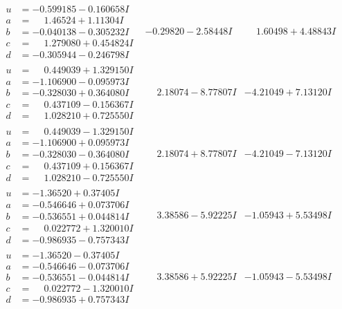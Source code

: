 \documentclass[1p]{elsarticle_modified}
\theoremstyle{definition}
\begin{document}
$$\begin{array}{c|c|c}
\begin{aligned}
u &= -0.599185 - 0.160658 I \\
a &= \phantom{-}1.46524 + 1.11304 I \\
b &= -0.040138 - 0.305232 I \\
c &= \phantom{-}1.279080 + 0.454824 I \\
d &= -0.305944 - 0.246798 I\end{aligned}
 & -0.29820 - 2.58448 I & \phantom{-}1.60498 + 4.48843 I \\ \hline\begin{aligned}
u &= \phantom{-}0.449039 + 1.329150 I \\
a &= -1.106900 - 0.095973 I \\
b &= -0.328030 + 0.364080 I \\
c &= \phantom{-}0.437109 - 0.156367 I \\
d &= \phantom{-}1.028210 + 0.725550 I\end{aligned}
 & \phantom{-}2.18074 - 8.77807 I & -4.21049 + 7.13120 I \\ \hline\begin{aligned}
u &= \phantom{-}0.449039 - 1.329150 I \\
a &= -1.106900 + 0.095973 I \\
b &= -0.328030 - 0.364080 I \\
c &= \phantom{-}0.437109 + 0.156367 I \\
d &= \phantom{-}1.028210 - 0.725550 I\end{aligned}
 & \phantom{-}2.18074 + 8.77807 I & -4.21049 - 7.13120 I \\ \hline\begin{aligned}
u &= -1.36520 + 0.37405 I \\
a &= -0.546646 + 0.073706 I \\
b &= -0.536551 + 0.044814 I \\
c &= \phantom{-}0.022772 + 1.320010 I \\
d &= -0.986935 - 0.757343 I\end{aligned}
 & \phantom{-}3.38586 - 5.92225 I & -1.05943 + 5.53498 I \\ \hline\begin{aligned}
u &= -1.36520 - 0.37405 I \\
a &= -0.546646 - 0.073706 I \\
b &= -0.536551 - 0.044814 I \\
c &= \phantom{-}0.022772 - 1.320010 I \\
d &= -0.986935 + 0.757343 I\end{aligned}
 & \phantom{-}3.38586 + 5.92225 I & -1.05943 - 5.53498 I\\

\end{array}$$
\end{document}

